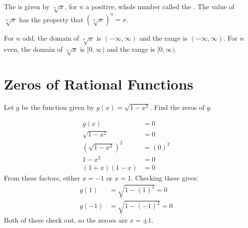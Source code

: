 \documentclass[nooutcomes]{ximera}
\begin{document}
	\begin{definition}
		The  is given by $\sqrt[n]{x}$, for $n$ a positive, whole number called the . The value of $\sqrt[n]{x}$
		 has the property that
		$\left( \sqrt[n]{x} \right)^n = x$. 
	\end{definition}
	
	For $n$ odd, the domain of $\sqrt[n]{x}$ is $(-\infty, \infty)$ and the range is $(-\infty, \infty)$. For $n$ even, the domain of $\sqrt[n]{x}$ is $[0, \infty)$ 
	and the range is $[0, \infty)$.
			


\section{Zeros of Rational Functions}

		
	\begin{example}

		Let $g$ be the function given by $g(x) = \sqrt{1-x^2}$. Find the zeros of $g$.
		
		\begin{explanation}
			
			\begin{align*}
				g(x) &= 0\\
				\sqrt{1-x^2} &= 0\\
				\left( \sqrt{1-x^2} \right)^2 &= (0)^2\\
				1-x^2 &= 0\\
				(1+x)(1-x) &= 0
			\end{align*}
			From these factors, either $x=-1$ or $x=1$. Checking these gives:
			\begin{align*}
				g(1) &= \sqrt{1-(1)^2} = 0\\
				g(-1) &= \sqrt{1-(-1)^2} = 0
			\end{align*}
			Both of these check out, so the zeroes are $x= \pm 1$.
			
		\end{explanation}
	\end{example}
\end{document}
